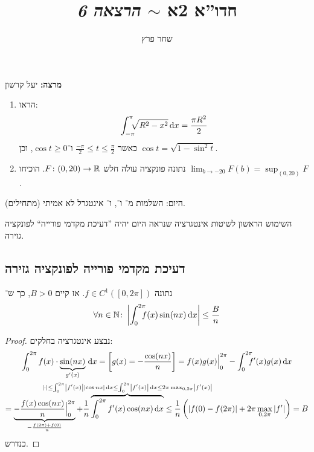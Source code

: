 \documentclass[]{../../../../tex/classes/styledArticle}
\author{שחר פרץ}
\title{חדו''א 2א $\sim$ \textit{הרצאה 6}}
\newcommand\Is{\dequad \ }
\begin{document}
	\maketitle
	\textbf{מרצה: }יעל קרשון
	
	\begin{Exercise}[פתיחה]
		\begin{enumerate}
			\item הראו: 
			\[ \int_{-\pi}^{\pi}\Is \sqrt{R^{2} - x^{2}}\dx = \frac{\pi R^{2}}{2} \]
			כאשר $\frac{-\pi}{2} \le t \le \frac{\pi}{2}$ ו־$\cos t \ge0$, וכן $\cos t = \sqrt{1 - \sin^{2}t}$. 
			
			\item נתונה פונקציה עולה חלש $F \colon (0, 20) \to \mathbb{R}$. הוכיחו $\lim_{b \to -20}F(b) = \sup_{(0, 20)}F$. 
		\end{enumerate}
		
		היום: השלמות מ־ ו־, ו־ אינטגרל לא אמיתי (מתחילים). 
	\end{Exercise}
	
	השימוש הראשון לשיטות אינטגרציה שנראה היום יהיה ''דעיכת מקדמי פורייה`` לפונקציה גזירה. 
	\subsection*{דעיכת מקדמי פורייה לפונקציה גזירה}
	נתונה $f \in C^{1}([0, 2\pi])$. אז קיים $B > 0$, כך ש־
	\[ \forall n \in \N \co \sof{\int^{2\pi}_0 \Is f(x) \sin(nx) \dx} \le \frac{B}{n}  \]
	\begin{proof}
		נבצע אינטגרציה בחלקים: 
		\begin{multline*}
			\int^{2\pi}_0 f(x) \cdot \underbrace{\sin(nx)}_{g'(x)}\dx = \csb{g(x) = -\frac{\cos(nx)}{n}} = f(x)g(x)\Big\vert^{2\pi}_0 - \int^{2\pi}_0 \Is f'(x) g(x) \dx \\
			= \underbrace{-\frac{f(x) \cos(nx)}{n}\Big\vert^{2\pi}_0}_{-\frac{f(2\pi) + f(0)}{n}} + \frac{1}{n}\overbrace{\int^{2\pi}_0 f'(x) \cos(nx) \dx}^{\mathclap{\smash{\sof{\cdot}\le \int^{2\pi}_0 \sof{f'(x)} \sof{\cos nx}} \dx \le \int^{2\pi}_0 \sof{f'(x)}\dx \le 2\pi\max_{0, 2\pi} \sof{f'(x)}}} \le \frac{1}{n}\cl{\sof{f(0) - f(2\pi)} + 2\pi \max_{0, 2\pi} \sof{f'}} = B
		\end{multline*}
		כנדרש. 
	\end{proof}
	
	
\end{document}
